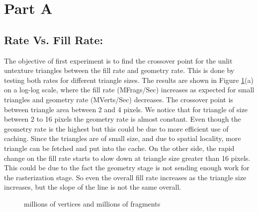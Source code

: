 \section{Part A}
\subsection{Rate Vs. Fill Rate:}
The objective of first experiment is to find the crossover point for the unlit untexture triangles between the fill rate and geometry rate. This is done by testing both rates for different triangle sizes. The results are shown in Figure \ref{fig:fill_geo1}(a) on a log-log scale, where the fill rate (MFrags/Sec) increases as expected for small triangles and geometry rate (MVerts/Sec) decreases. The crossover point is between triangle area between 2 and 4 pixels. We notice that for triangle of size between 2 to 16 pixels the geometry rate is almost constant.  Even though the geometry rate is the highest but this could be due to more efficient use of caching. Since the triangles are of small size, and due to spatial locality, more triangle can be fetched and put into the cache. On the other side, the rapid change on the fill rate starts to slow down at triangle size greater than 16 pixels. This could be due to the fact the geometry stage is not sending enough work for the rasterization stage. So even the overall fill rate increases as the triangle size increases, but the slope of the line is not the same overall.

\begin{figure}[!tbh]
 \centering  
  \caption{millions of vertices and millions of fragments}
   \label{fig:fill_geo1}
\end{figure} 

